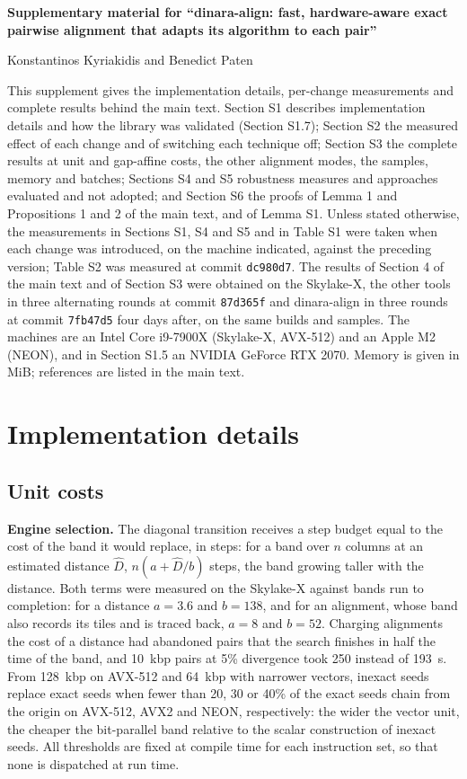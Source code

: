\documentclass[10pt]{article}
\begin{document}
{\Large\bfseries Supplementary material for ``dinara-align: fast, hardware-aware exact pairwise alignment that adapts its algorithm to each pair''\par}\medskip
{\large Konstantinos Kyriakidis and Benedict Paten}\par\bigskip
This supplement gives the implementation details, per-change measurements and complete results behind the main text. Section S1 describes implementation details and how the library was validated (Section S1.7); Section S2 the measured effect of each change and of switching each technique off; Section S3 the complete results at unit and gap-affine costs, the other alignment modes, the samples, memory and batches; Sections S4 and S5 robustness measures and approaches evaluated and not adopted; and Section S6 the proofs of Lemma 1 and Propositions 1 and 2 of the main text, and of Lemma S1. Unless stated otherwise, the measurements in Sections S1, S4 and S5 and in Table S1 were taken when each change was introduced, on the machine indicated, against the preceding version; Table S2 was measured at commit \texttt{dc980d7}. The results of Section 4 of the main text and of Section S3 were obtained on the Skylake-X, the other tools in three alternating rounds at commit \texttt{87d365f} and dinara-align in three rounds at commit \texttt{7fb47d5} four days after, on the same builds and samples. The machines are an Intel Core i9-7900X (Skylake-X, AVX-512) and an Apple M2 (NEON), and in Section S1.5 an NVIDIA GeForce RTX 2070. Memory is given in MiB; references are listed in the main text.

\section{Implementation details}

\subsection{Unit costs}

\textbf{Engine selection.} The diagonal transition receives a step budget equal to the cost of the band it would replace, in steps: for a band over \(n\) columns at an estimated distance \(\hat D\), \(n(a + \hat D/b)\) steps, the band growing taller with the distance. Both terms were measured on the Skylake-X against bands run to completion: for a distance \(a = 3.6\) and \(b = 138\), and for an alignment, whose band also records its tiles and is traced back, \(a = 8\) and \(b = 52\). Charging alignments the cost of a distance had abandoned pairs that the search finishes in half the time of the band, and 10~kbp pairs at 5\% divergence took 250 instead of 193~\textmu s. From 128~kbp on AVX-512 and 64~kbp with narrower vectors, inexact seeds replace exact seeds when fewer than 20, 30 or 40\% of the exact seeds chain from the origin on AVX-512, AVX2 and NEON, respectively: the wider the vector unit, the cheaper the bit-parallel band relative to the scalar construction of inexact seeds. All thresholds are fixed at compile time for each instruction set, so that none is dispatched at run time.
\end{document}
